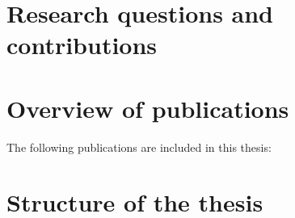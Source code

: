 \section{Research questions and contributions}

\section{Overview of publications}
The following publications are included in this thesis:

\section{Structure of the thesis}